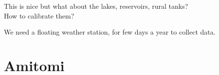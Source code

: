 \documentclass[aspectratio=169,unknownkeysallowed,xcolor=dvipsnames,beamer]{beamer} %
\begin{document}
\begin{frame}[plain]
This is nice but what about the lakes, reservoirs, rural tanks?\\
How to calibrate them?
\end{frame}

{
\begin{frame}[plain]
\end{frame}}

\begin{frame}[plain]
We need a floating weather station, for few days a year to collect data.
\end{frame}

\section{Amitomi}
\end{document}
